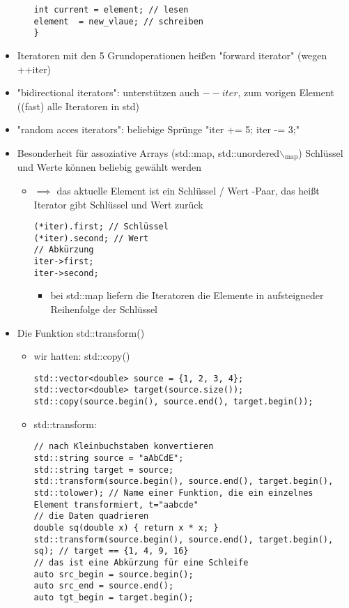 \documentclass[a4paper]{scrartcl}
\begin{document}
\begin{itemize}
\begin{itemize}
\begin{verbatim}
int current = element; // lesen
element  = new_vlaue; // schreiben
}
\end{verbatim}
\end{itemize}
\item Iteratoren mit den 5 Grundoperationen heißen "forward iterator" (wegen ++iter)
\item "bidirectional iterators": unterstützen auch $--iter$, zum vorigen Element ((fast) alle Iteratoren in std)
\item "random acces iterators": beliebige Sprünge "iter += 5; iter -= 3;"
\item Besonderheit für assoziative Arrays (std::map, std::unordered$\backslash$$_{\text{map}}$)
Schlüssel und Werte können beliebig gewählt werden
\begin{itemize}
\item $\implies$ das aktuelle Element ist ein Schlüssel / Wert -Paar, das heißt Iterator gibt Schlüssel und Wert zurück
\begin{verbatim}
(*iter).first; // Schlüssel
(*iter).second; // Wert
// Abkürzung
iter->first;
iter->second;
\end{verbatim}
\begin{itemize}
\item bei std::map liefern die Iteratoren die Elemente in aufsteigneder Reihenfolge der Schlüssel
\end{itemize}
\end{itemize}
\item Die Funktion std::transform()
\begin{itemize}
\item wir hatten: std::copy()
\begin{verbatim}
std::vector<double> source = {1, 2, 3, 4};
std::vector<double> target(source.size());
std::copy(source.begin(), source.end(), target.begin());
\end{verbatim}
\item std::transform:
\begin{verbatim}
// nach Kleinbuchstaben konvertieren
std::string source = "aAbCdE";
std::string target = source;
std::transform(source.begin(), source.end(), target.begin(), std::tolower); // Name einer Funktion, die ein einzelnes Element transformiert, t="aabcde"
// die Daten quadrieren
double sq(double x) { return x * x; }
std::transform(source.begin(), source.end(), target.begin(), sq); // target == {1, 4, 9, 16}
// das ist eine Abkürzung für eine Schleife
auto src_begin = source.begin();
auto src_end = source.end();
auto tgt_begin = target.begin();


\end{verbatim}
\end{itemize}$$
\end{itemize}
\end{document}
